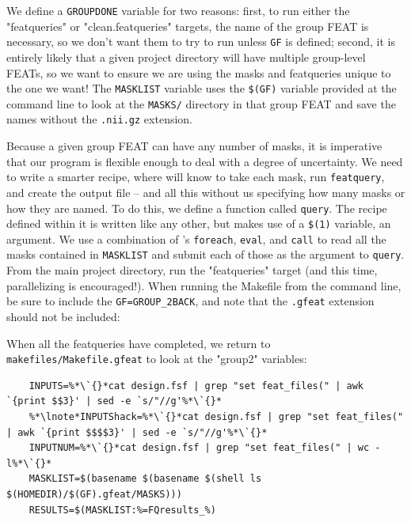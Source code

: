 We define a \texttt{GROUPDONE} variable for two reasons: first, to run either the "featqueries" or "clean.featqueries" targets, the name of the group FEAT is necessary, so we don't want them to try to run unless \texttt{GF} is defined; second, it is entirely likely that a given project directory will have multiple group-level FEATs, so we want to ensure we are using the masks and featqueries unique to the one we want! The \texttt{MASKLIST} variable uses the \texttt{\$(GF)} variable provided at the command line to look at the \texttt{MASKS/} directory in that group FEAT and save the names without the \texttt{.nii.gz} extension. 

Because a given group FEAT can have any number of masks, it is imperative that our program is flexible enough to deal with a degree of uncertainty. We need to write a smarter recipe, where \maken{} will know to take each mask, run \texttt{featquery}, and create the output file -- and all this without us specifying how many masks or how they are named.  To do this, we define a function called \texttt{query}. The recipe defined within it is written like any other, but makes use of a \texttt{\$(1)} variable, an argument. We use a combination of \maken{}'s \texttt{foreach}, \texttt{eval}, and \texttt{call} to read all the masks contained in \texttt{MASKLIST} and submit each of those as the argument to \texttt{query}. From the main project directory, run the "featqueries" target (and this time, parallelizing is encouraged!). When running the Makefile from the command line, be sure to include the \texttt{GF=GROUP_2BACK}, and note that the \texttt{.gfeat} extension should not be included:

When all the featqueries have completed, we return to \texttt{makefiles/Makefile.gfeat} to look at the "group2" variables:

\begin{lstlisting}
	INPUTS=%*\`{}*cat design.fsf | grep "set feat_files(" | awk `{print $$3}' | sed -e `s/"//g'%*\`{}*
	%*\lnote*INPUTShack=%*\`{}*cat design.fsf | grep "set feat_files(" | awk `{print $$$$3}' | sed -e `s/"//g'%*\`{}*
	INPUTNUM=%*\`{}*cat design.fsf | grep "set feat_files(" | wc -l%*\`{}*
	MASKLIST=$(basename $(basename $(shell ls $(HOMEDIR)/$(GF).gfeat/MASKS)))
	RESULTS=$(MASKLIST:%=FQresults_%)
\end{lstlisting}

